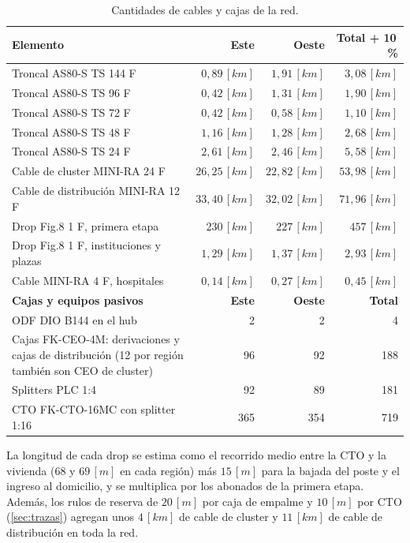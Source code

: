 \begin{table}[H]
    \centering
    \footnotesize
    \caption{Cantidades de cables y cajas de la red.}
    \label{tab:cantidades}
    \begin{tabular}{|p{6.0cm}|r|r|r|}
        \hline
        \textbf{Elemento} & \textbf{Este} & \textbf{Oeste} & \textbf{Total + 10\,\%} \\
        \hline
        Troncal AS80-S TS 144 F & $0{,}89 \, [km]$ & $1{,}91 \, [km]$ & $3{,}08 \, [km]$ \\
        Troncal AS80-S TS 96 F & $0{,}42 \, [km]$ & $1{,}31 \, [km]$ & $1{,}90 \, [km]$ \\
        Troncal AS80-S TS 72 F & $0{,}42 \, [km]$ & $0{,}58 \, [km]$ & $1{,}10 \, [km]$ \\
        Troncal AS80-S TS 48 F & $1{,}16 \, [km]$ & $1{,}28 \, [km]$ & $2{,}68 \, [km]$ \\
        Troncal AS80-S TS 24 F & $2{,}61 \, [km]$ & $2{,}46 \, [km]$ & $5{,}58 \, [km]$ \\
        Cable de cluster MINI-RA 24 F & $26{,}25 \, [km]$ & $22{,}82 \, [km]$ & $53{,}98 \, [km]$ \\
        Cable de distribución MINI-RA 12 F & $33{,}40 \, [km]$ & $32{,}02 \, [km]$ & $71{,}96 \, [km]$ \\
        Drop Fig.8 1 F, primera etapa & $230 \, [km]$ & $227 \, [km]$ & $457 \, [km]$ \\
        Drop Fig.8 1 F, instituciones y plazas & $1{,}29 \, [km]$ & $1{,}37 \, [km]$ & $2{,}93 \, [km]$ \\
        Cable MINI-RA 4 F, hospitales & $0{,}14 \, [km]$ & $0{,}27 \, [km]$ & $0{,}45 \, [km]$ \\
        \hline
        \textbf{Cajas y equipos pasivos} & \textbf{Este} & \textbf{Oeste} & \textbf{Total} \\
        \hline
        ODF DIO B144 en el hub & 2 & 2 & 4 \\
        Cajas FK-CEO-4M: derivaciones y cajas de distribución (12 por región también son CEO de cluster) & 96 & 92 & 188 \\
        Splitters PLC 1:4 & 92 & 89 & 181 \\
        CTO FK-CTO-16MC con splitter 1:16 & 365 & 354 & 719 \\
        \hline
    \end{tabular}
\end{table}

La longitud de cada drop se estima como el recorrido medio entre la CTO y la vivienda (68 y $69 \, [m]$ en cada región) más $15 \, [m]$ para la bajada del poste y el ingreso al domicilio, y se multiplica por los abonados de la primera etapa. Además, los rulos de reserva de $20 \, [m]$ por caja de empalme y $10 \, [m]$ por CTO (\autoref{sec:trazas}) agregan unos $4 \, [km]$ de cable de cluster y $11 \, [km]$ de cable de distribución en toda la red.

